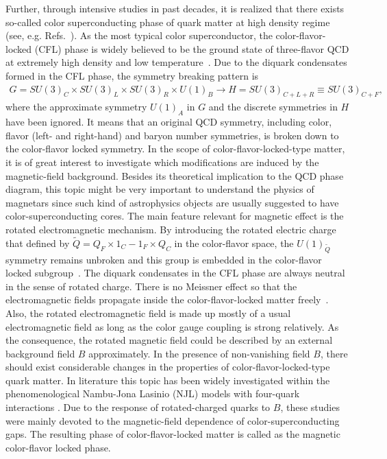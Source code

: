 \documentclass[12pt]{article}
\begin{document}
Further, through intensive studies in past decades, it is realized that there exists so-called color
superconducting phase of quark matter at high density regime (see, e.g.
Refs.~\cite{alford2004dense,buballa2005njl}). As the most typical color superconductor, the color-flavor-locked (CFL) phase is widely believed to be the ground state of three-flavor QCD at extremely high density and low temperature~\cite{alford1998qcd}. Due to the diquark condensates formed in the CFL phase, the symmetry breaking pattern is
\begin{eqnarray}
G=SU(3)_{C}\times SU(3)_{L}
\times SU(3)_{R}\times U(1)_{B} \rightarrow H=SU(3)_{C+L+R}\equiv SU(3)_{C+F},\label{cfl}
\end{eqnarray}
where the approximate symmetry $U(1)_{A}$ in $G$ and the discrete symmetries in $H$ have been ignored.
It means that an original QCD symmetry, including color, flavor (left- and right-hand) and baryon number
symmetries, is broken down to the color-flavor locked symmetry.
In the scope of color-flavor-locked-type matter, it is of
great interest to investigate which modifications are induced by the magnetic-field background.
Besides its theoretical implication to the QCD phase diagram, this topic might be very important to understand the physics of
magnetars since such kind of astrophysics objects are usually suggested to have color-superconducting cores.
The main feature relevant for magnetic effect is the rotated electromagnetic mechanism.
By introducing the rotated electric charge that defined by
$\widetilde{Q}=Q_{F}\times {1}_{C}-{1}_{F}\times Q_{C}$ in the color-flavor space, the
$U(1)_{\widetilde{Q}}$ symmetry remains unbroken
and this group is embedded in the color-flavor locked subgroup~\cite{alford1998qcd}.
The diquark condensates in the CFL phase are always neutral in the sense of rotated charge.
There is no Meissner effect so that the electromagnetic
fields propagate inside the color-flavor-locked matter freely~\cite{alford1998qcd,alford2000magnetic}.
Also, the rotated electromagnetic field is made up mostly of a usual
electromagnetic field as long as the color gauge coupling is strong relatively.
As the consequence, the rotated magnetic field could be described by an external background field
$B$ approximately.
In the presence of non-vanishing field $B$, there should exist considerable changes in the properties
of color-flavor-locked-type quark matter.
In literature this topic has been widely investigated within the phenomenological Nambu-Jona Lasinio (NJL)
models with four-quark
interactions \cite{ferrer2005magnetic,fukushima2008color,ferrer2006color,ferrer2007magnetic,sen2015anisotropic}.
Due to the response of rotated-charged quarks to $B$, these studies were mainly devoted to the magnetic-field
dependence of color-superconducting gaps. The resulting phase of color-flavor-locked matter is called as the
magnetic color-flavor locked phase.
\end{document}

